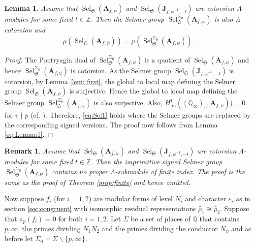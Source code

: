 \documentclass{amsart}
\newcommand{\ur}{\mathrm{un}}
\newcommand{\Q}{\mathbb{Q}}
\newcommand{\Z}{\mathbb{Z}}
\newcommand{\fS}{\mathfrak{S}}
\newcommand{\bJ}{\mathbf{J}}
\newcommand{\bA}{\mathbf{A}}
\newcommand{\Sel}{\operatorname{Sel}}
\newtheorem{auxiliary proposition}[theorem]{Auxiliary Proposition}
\newtheorem{lemma}[theorem]{Lemma}
\newtheorem{main conjecture}[theorem]{Main Conjecture}
\newtheorem{main theorem}[theorem]{Main Theorem}
\newtheorem{modesty proposition}[theorem]{Modesty Proposition}
\newtheorem{open problem}[theorem]{Open Problem}
\newtheorem{remark}[theorem]{Remark}
\newtheorem{convergence lemma}[theorem]{Convergence Lemma}
\newtheorem{corrected lemma}[theorem]{Corrected Lemma}
\newtheorem{growth lemma}[theorem]{Growth Lemma}
\newtheorem{coefficient lemma}[theorem]{Integrality Lemma}
\newtheorem{interpolation lemma}[theorem]{Interpolation Lemma}
\newtheorem{kernel lemma}[theorem]{Kernel Lemma}
\newtheorem{limit lemma}[theorem]{Limit Lemma}
\newtheorem{tandem lemma}[theorem]{Modesty Lemma}
\newtheorem{zero-finding lemma}[theorem]{Zero-Finding Lemma}
\begin{document}
\begin{lemma}\label{lem:4.9}
    Assume that $\Sel_{\fS}(\bA_{f, \psi})$ and $\Sel_{\fS}(\bJ_{f, \psi^{-1},-t})$ are cotorsion $\Lambda$-modules for some fixed $t\in \Z$. Then the Selmer group $\Sel^{\Sigma_0}_{\fS}(\bA_{f, \psi})$ is also $\Lambda$-cotorsion and 
     $$\mu(\Sel_{\fS}(\bA_{f, \psi})) =\mu(\Sel^{\Sigma_0}_{\fS}(\bA_{f, \psi})).$$
\end{lemma}
\begin{proof}
    The Pontryagin dual of $\Sel^{\Sigma_0}_{\fS}(\bA_{f, \psi})$ is a quotient of $\Sel_{\fS}(\bA_{f, \psi})$ and hence $\Sel^{\Sigma_0}_{\fS}(\bA_{f, \psi})$ is cotorsion. As the Selmer group $\Sel_{\fS}(\bJ_{f, \psi^{-1},-t})$ is cotorsion, by Lemma \ref{lem: first}, the global to local map defining the Selmer group $\Sel_{\fS}(\bA_{f, \psi})$ is surjective. Hence the global to local map defining the Selmer group $\Sel^{\Sigma_0}_{\fS}(\bA_{f, \psi})$ is also surjective. Also, $H^1_{\ur}((\Q_\infty)_v, \bA_{f, \psi}))=0$ for $v \nmid p$ (cf. \cite[A.2.4]{PR95}). Therefore,
    \eqref{eq:Sel1} holds where the Selmer groups are replaced by the corresponding signed versions. The proof now follows from Lemma \ref{eq:Lemma1}.
\end{proof}
\begin{remark}\label{rem:one}
      Assume that $\Sel_{\fS}(\bA_{f, \psi})$ and $\Sel_{\fS}(\bJ_{f, \psi^{-1},-t})$ are cotorsion $\Lambda$-modules for some fixed $t\in \Z$. Then the imprimitive signed Selmer group
$\Sel^{\Sigma_0}_{\fS}(\bA_{f, \psi})$ contains no proper $\Lambda$-submodule of finite index. The proof is the same as the proof of  Theorem \ref{prop:finite} and hence omitted.
\end{remark}
Now suppose $f_i$ (for $i=1,2$) are modular forms of level $N_i$ and character $\varepsilon_i$ as in section \ref{sec:congruent} with isomorphic residual representations $\tilde{\rho_1} \cong \tilde{\rho_2}$. Suppose that $a_p(f_i)=0$ for both $i =1,2$. Let $\Sigma$ be a set of places of $\Q$ that contains $p, \infty$, the primes dividing $N_1N_2$ and  the primes dividing the conductor $N_\psi$ and as before let $\Sigma_0=\Sigma \backslash \{p,\infty\}.$
\end{document}
